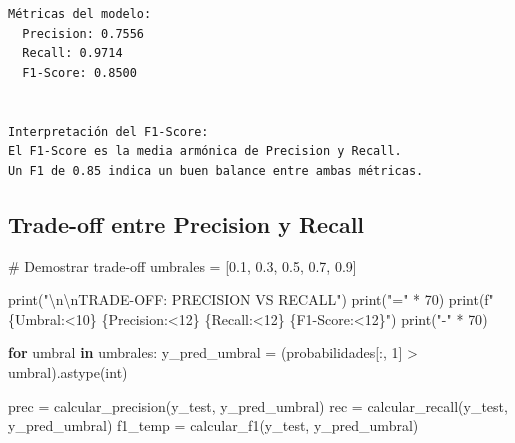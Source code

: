 \documentclass[
  doc,
  floatsintext,
  longtable,
  a4paper,
  nolmodern,
  notxfonts,
  notimes,
  12pt,
  colorlinks=true,linkcolor=blue,citecolor=blue,urlcolor=blue]{apa7}
\newenvironment{Shaded}{\begin{snugshade}}{\end{snugshade}}
\newcommand{\BuiltInTok}[1]{\textcolor[rgb]{0.00,0.23,0.31}{#1}}
\newcommand{\CharTok}[1]{\textcolor[rgb]{0.13,0.47,0.30}{#1}}
\newcommand{\CommentTok}[1]{\textcolor[rgb]{0.37,0.37,0.37}{#1}}
\newcommand{\ControlFlowTok}[1]{\textcolor[rgb]{0.00,0.23,0.31}{\textbf{#1}}}
\newcommand{\DecValTok}[1]{\textcolor[rgb]{0.68,0.00,0.00}{#1}}
\newcommand{\FloatTok}[1]{\textcolor[rgb]{0.68,0.00,0.00}{#1}}
\newcommand{\KeywordTok}[1]{\textcolor[rgb]{0.00,0.23,0.31}{\textbf{#1}}}
\newcommand{\NormalTok}[1]{\textcolor[rgb]{0.00,0.23,0.31}{#1}}
\newcommand{\OperatorTok}[1]{\textcolor[rgb]{0.37,0.37,0.37}{#1}}
\newcommand{\SpecialCharTok}[1]{\textcolor[rgb]{0.37,0.37,0.37}{#1}}
\newcommand{\SpecialStringTok}[1]{\textcolor[rgb]{0.13,0.47,0.30}{#1}}
\newcommand{\StringTok}[1]{\textcolor[rgb]{0.13,0.47,0.30}{#1}}
\begin{document}
\begin{verbatim}
Métricas del modelo:
  Precision: 0.7556
  Recall: 0.9714
  F1-Score: 0.8500


Interpretación del F1-Score:
El F1-Score es la media armónica de Precision y Recall.
Un F1 de 0.85 indica un buen balance entre ambas métricas.
\end{verbatim}

\subsection{Trade-off entre Precision y
Recall}\label{trade-off-entre-precision-y-recall}

\begin{Shaded}
\begin{Highlighting}[]
\CommentTok{\# Demostrar trade{-}off}
\NormalTok{umbrales }\OperatorTok{=}\NormalTok{ [}\FloatTok{0.1}\NormalTok{, }\FloatTok{0.3}\NormalTok{, }\FloatTok{0.5}\NormalTok{, }\FloatTok{0.7}\NormalTok{, }\FloatTok{0.9}\NormalTok{]}

\BuiltInTok{print}\NormalTok{(}\StringTok{"}\CharTok{\textbackslash{}n\textbackslash{}n}\StringTok{TRADE{-}OFF: PRECISION VS RECALL"}\NormalTok{)}
\BuiltInTok{print}\NormalTok{(}\StringTok{"="} \OperatorTok{*} \DecValTok{70}\NormalTok{)}
\BuiltInTok{print}\NormalTok{(}\SpecialStringTok{f"}\SpecialCharTok{\{}\StringTok{\textquotesingle{}Umbral\textquotesingle{}}\SpecialCharTok{:\textless{}10\}}\SpecialStringTok{ }\SpecialCharTok{\{}\StringTok{\textquotesingle{}Precision\textquotesingle{}}\SpecialCharTok{:\textless{}12\}}\SpecialStringTok{ }\SpecialCharTok{\{}\StringTok{\textquotesingle{}Recall\textquotesingle{}}\SpecialCharTok{:\textless{}12\}}\SpecialStringTok{ }\SpecialCharTok{\{}\StringTok{\textquotesingle{}F1{-}Score\textquotesingle{}}\SpecialCharTok{:\textless{}12\}}\SpecialStringTok{"}\NormalTok{)}
\BuiltInTok{print}\NormalTok{(}\StringTok{"{-}"} \OperatorTok{*} \DecValTok{70}\NormalTok{)}

\ControlFlowTok{for}\NormalTok{ umbral }\KeywordTok{in}\NormalTok{ umbrales:}
\NormalTok{    y\_pred\_umbral }\OperatorTok{=}\NormalTok{ (probabilidades[:, }\DecValTok{1}\NormalTok{] }\OperatorTok{\textgreater{}}\NormalTok{ umbral).astype(}\BuiltInTok{int}\NormalTok{)}
    
\NormalTok{    prec }\OperatorTok{=}\NormalTok{ calcular\_precision(y\_test, y\_pred\_umbral)}
\NormalTok{    rec }\OperatorTok{=}\NormalTok{ calcular\_recall(y\_test, y\_pred\_umbral)}
\NormalTok{    f1\_temp }\OperatorTok{=}\NormalTok{ calcular\_f1(y\_test, y\_pred\_umbral)}
    

\end{Highlighting}
\end{Shaded}
\end{document}
